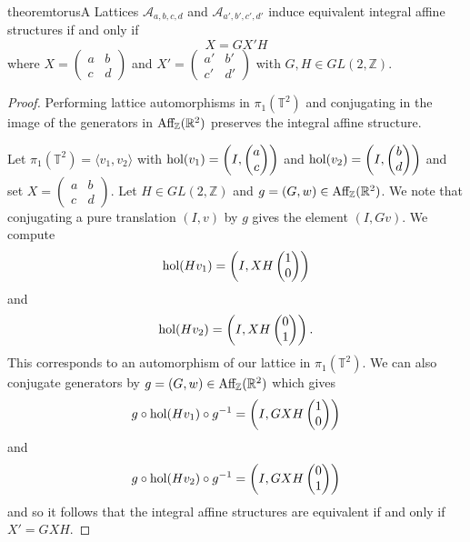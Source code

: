 \begin{restatable}{theorem}{torusA}\label{thm:torus-series-a}
    Lattices $\mathcal{A}_{a,b,c,d}$ and $\mathcal{A}_{a',b',c',d'}$ induce
    equivalent integral affine structures if and only if $$X = GX'H$$ where $X = \begin{pmatrix}
            a & b \\
            c & d
        \end{pmatrix}$ and $X' = \begin{pmatrix}
            a' & b' \\
            c' & d'
        \end{pmatrix}$ with $G,H \in GL(2,\mathbb{Z}).$
\end{restatable}
\begin{proof}
    Performing lattice automorphisms in $\pi_1(\mathbb{T}^2)$ and conjugating in
    the image of the generators in $\text{Aff}_{\mathbb{Z}}(\mathbb{R}^2)$ preserves the integral affine
    structure.

    Let $\pi_1(\mathbb{T}^2) = \langle v_1, v_2\rangle$ with $\text{hol}(v_1) = \left(I, \begin{pmatrix}
                a \\ c
            \end{pmatrix} \right)$ and $\text{hol}(v_2) = \left(I, \begin{pmatrix}
                b \\ d
            \end{pmatrix} \right)$ and set $X= \begin{pmatrix}
            a & b \\
            c & d
        \end{pmatrix}$. Let $H \in GL(2,
        \mathbb{Z})$ and $g = (G, w) \in \text{Aff}_{\mathbb{Z}}(\mathbb{R}^2)$. We note that conjugating a pure translation $\left(I, v\right)$ by $g$ gives the element $\left(I, Gv\right)$. We compute
    $$
        \text{hol}(Hv_1) = \left(I, XH\begin{pmatrix}
                1 \\ 0
            \end{pmatrix}\right)
    $$
    and
    $$
        \text{hol}(Hv_2) = \left(I, XH\begin{pmatrix}
                0 \\ 1
            \end{pmatrix}\right).
    $$
    This corresponds to an automorphism of our lattice in $\pi_1(\mathbb{T}^2)$. We can also conjugate generators by $g = (G, w) \in \text{Aff}_{\mathbb{Z}}(\mathbb{R}^2)$ which gives
    $$
        g\circ \text{hol}(Hv_1) \circ g^{-1} = \left(I, GXH\begin{pmatrix}
                1 \\ 0
            \end{pmatrix}\right)
    $$
    and
    $$
        g\circ \text{hol}(Hv_2) \circ g^{-1} = \left(I, GXH\begin{pmatrix}
                0 \\ 1
            \end{pmatrix}\right)
    $$
    and so it follows that the integral affine structures are equivalent if and only if $X' = GXH$.
\end{proof}

